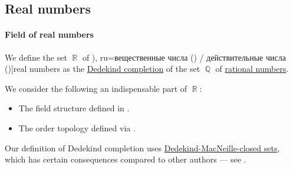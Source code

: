 \subsection{Real numbers}\label{subsec:real_numbers}

\paragraph{Field of real numbers}

\begin{definition}\label{def:real_numbers}
  We define the set \( \BbbR \) of \term[bg=реални числа (\cite[ch. I]{Тагамлицки1971Диф}), ru=вещественные числа (\cite[]{ФихтенгольцОсновыТом1}) / действительные числа (\cite[36]{Александров1977Введение})]{real numbers} as the \hyperref[def:dedekind_completion]{Dedekind completion} of the set \( \BbbQ \) of \hyperref[def:rational_numbers]{rational numbers}.
\end{definition}
\begin{comments}
  \item We consider the following an indispensable part of \( \BbbR \):
  \begin{itemize}
    \item The field structure defined in .
    \item The order topology defined via .
  \end{itemize}

  \item Our definition of Dedekind completion uses \hyperref[def:dedekind_macnielle_closure]{Dedekind-MacNeille-closed sets}, which has certain consequences compared to other authors --- see .
\end{comments}

